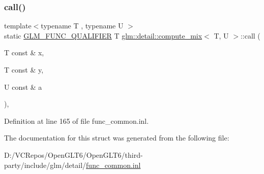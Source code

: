 \subsubsection{\texorpdfstring{call()}{call()}}
{\footnotesize\ttfamily template$<$typename T , typename U $>$ \\
static \mbox{\hyperlink{setup_8hpp_a33fdea6f91c5f834105f7415e2a64407}{G\+L\+M\+\_\+\+F\+U\+N\+C\+\_\+\+Q\+U\+A\+L\+I\+F\+I\+ER}} T \mbox{\hyperlink{structglm_1_1detail_1_1compute__mix}{glm\+::detail\+::compute\+\_\+mix}}$<$ T, U $>$\+::call (\begin{DoxyParamCaption}\item[{T const \&}]{x,  }\item[{T const \&}]{y,  }\item[{U const \&}]{a }\end{DoxyParamCaption})\hspace{0.3cm}{\ttfamily [inline]}, {\ttfamily [static]}}



Definition at line 165 of file func\+\_\+common.\+inl.



The documentation for this struct was generated from the following file\+:\begin{DoxyCompactItemize}
\item 
D\+:/\+V\+C\+Repos/\+Open\+G\+L\+T6/\+Open\+G\+L\+T6/third-\/party/include/glm/detail/\mbox{\hyperlink{func__common_8inl}{func\+\_\+common.\+inl}}\end{DoxyCompactItemize}
